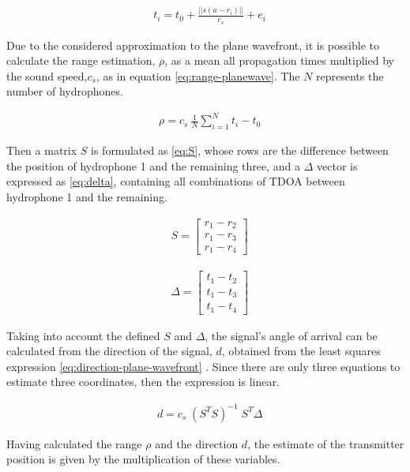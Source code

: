 \begin{eqnarray}
& t_i = t_0 + \frac{ ||s (a - r_i)|| }{c_s} + e_i
\label{eq:toa-planewave}
\end{eqnarray}

Due to the considered approximation to the plane wavefront, it is possible to calculate the range estimation, $\rho$, as a mean all propagation times multiplied by the sound speed,$c_s$, as in equation \ref{eq:range-planewave}. The $N$ represents the number of hydrophones.

\begin{eqnarray}
& \rho = c_s\ \frac{1}{N} \displaystyle\sum_{i=1}^{N} t_{i} - t_0
\label{eq:range-planewave}
\end{eqnarray}

Then a matrix $S$ is formulated as \ref{eq:S}, whose rows are the difference between the position of hydrophone 1 and the remaining three, and a $\Delta$ vector is expressed as \ref{eq:delta}, containing all combinations of TDOA between hydrophone 1 and the remaining.

\begin{eqnarray}
	& S = 
	\begin{bmatrix}
		r_1 - r_2\\
		r_1 - r_3\\
		r_1 - r_4
	\end{bmatrix}
	\label{eq:S}
\end{eqnarray}

\begin{eqnarray}
	& \Delta = 
	\begin{bmatrix}
		t_1 - t_2 \\
		t_1 - t_3 \\
		t_1 - t_4 
	\end{bmatrix}
	\label{eq:delta}
\end{eqnarray}

Taking into account the defined $S$ and $\Delta$, the signal's angle of arrival can be calculated from the direction of the signal, $d$, obtained from the least squares expression \ref{eq:direction-plane-wavefront} \cite{estim-plane-wavefront}. Since there are only three equations to estimate three coordinates, then the expression is linear. 

\begin{eqnarray}
& d = c_s \; (S^{T}S)^{-1} \; S^{T} \Delta
\label{eq:direction-plane-wavefront}
\end{eqnarray}

Having calculated the range $\rho$ and the direction $d$, the estimate of the transmitter position is given by the multiplication of these variables.

